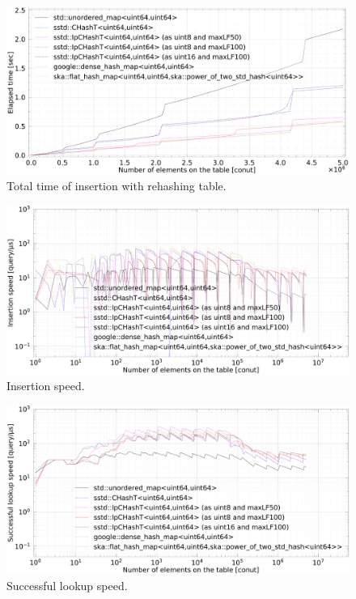 \begin{figure}[h]
  \includegraphics[scale=0.24]{./fig_bench/insert_et_med.pdf}
  \caption{ Total time of insertion with rehashing table. }
  \label{fig_bench_insert_wRehash}
\end{figure}

\begin{figure}[h]
  \hspace{-3mm}
  \includegraphics[scale=0.24]{./fig_bench/insert_med.pdf}
  \caption{ Insertion speed. }
  \label{fig_bench_insert}
\end{figure}

\begin{figure}[h]
  \hspace{-3mm}
  \includegraphics[scale=0.24]{./fig_bench/find_successful_lookup_med.pdf}
  \caption{ Successful lookup speed. }
  \label{fig_bench_insert}
\end{figure}


